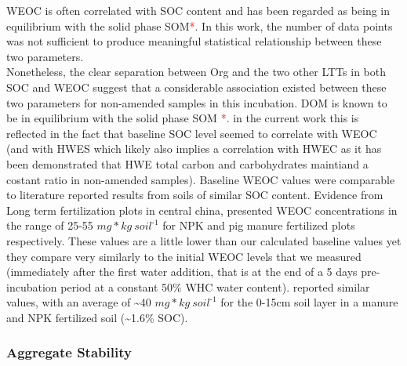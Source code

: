 \documentclass[12pt]{report}
\newcommand{\myRed}[1]{\textcolor{red}{#1}} %
\newlength{\SpaceAfterUnit}
\newcommand{\genericunit}{$ mg * kg\ soil^{\text{-}1}$ \hspace*{\SpaceAfterUnit}}
\begin{document}
			WEOC is often correlated with SOC content and has been regarded as being in equilibrium with the solid phase SOM\myRed{*}. In this work, the number of data points was not sufficient to produce meaningful statistical relationship between these two parameters.\\
		    Nonetheless, the clear separation between Org and the two other LTTs in both SOC and WEOC suggest that a considerable association existed between these two parameters for non-amended samples in this incubation. DOM is known to be in equilibrium with the solid phase SOM \myRed{*}. in the current work this is reflected in the fact that baseline SOC level seemed to correlate with WEOC (and with HWES which likely also implies a correlation with HWEC as it has been demonstrated that HWE total carbon and carbohydrates maintiand a costant ratio in non-amended samples).
		    Baseline WEOC values were comparable to literature reported results from soils of similar SOC content. Evidence from Long term fertilization plots in central china, presented WEOC concentrations in the range of 25-55 \genericunit for NPK and pig manure fertilized plots respectively\citep{xu2018}. These values are a little lower than our calculated baseline values yet they compare very similarly to the initial WEOC levels that we measured (immediately after the first water addition, that is  at the end of a 5 days pre-incubation period at a constant 50\% WHC water content). \citet{hamkalo2014} reported similar values, with an average of \~{}40 \genericunit for the 0-15cm  soil layer in a manure and NPK fertilized soil (\~{}1.6\% SOC).
			
   		\subsubsection{Aggregate Stability}
   		
\end{document}

